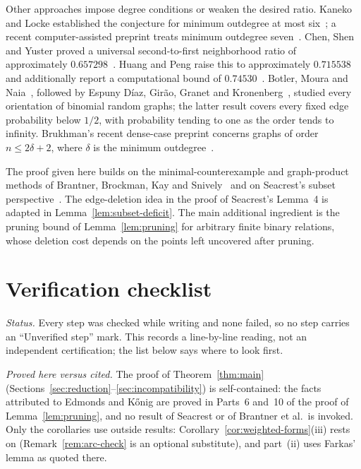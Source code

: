 \documentclass[11pt]{article}
\theoremstyle{remark}
\begin{document}
Other approaches impose degree conditions or weaken the desired ratio.
Kaneko and Locke established the conjecture for minimum outdegree at most
six~\cite{KanekoLocke2001}; a recent computer-assisted preprint treats
minimum outdegree seven~\cite{SadhukhanSandeepSen2026}.
Chen, Shen and Yuster proved a universal second-to-first neighborhood
ratio of approximately $0.657298$~\cite{ChenShenYuster2003}.
Huang and Peng raise this to approximately $0.715538$ and additionally
report a computational bound of $0.74530$~\cite{HuangPeng2024}.
Botler, Moura and Naia~\cite{BotlerMouraNaia2023}, followed by
Espuny D\'iaz, Gir\~ao, Granet and Kronenberg~\cite{EspunyDiazEtAl2025},
studied every orientation of binomial random graphs; the latter result
covers every fixed edge probability below $1/2$, with probability tending
to one as the order tends to infinity. Brukhman's recent dense-case
preprint concerns graphs of order $n\leq 2\delta+2$, where $\delta$ is
the minimum outdegree~\cite{Brukhman2026}.

The proof given here builds on the minimal-counterexample and graph-product
methods of Brantner, Brockman, Kay and
Snively~\cite{BrantnerBrockmanKaySnively2009} and on Seacrest's
subset perspective~\cite{Seacrest2019}. The edge-deletion idea in the proof
of Seacrest's Lemma~4 is adapted in Lemma~\ref{lem:subset-deficit}. The main
additional ingredient is the pruning bound of Lemma~\ref{lem:pruning} for
arbitrary finite binary relations, whose deletion cost depends on the points
left uncovered after pruning.

\section{Verification checklist}\label{sec:checklist}

\emph{Status.} Every step was checked while writing and none failed, so no
step carries an ``Unverified step'' mark. This records a line-by-line
reading, not an independent certification; the list below says where to
look first.

\emph{Proved here versus cited.} The proof of Theorem~\ref{thm:main}
(Sections~\ref{sec:reduction}--\ref{sec:incompatibility}) is self-contained:
the facts attributed to Edmonds and K\H{o}nig are proved in Parts~6 and~10
of the proof of Lemma~\ref{lem:pruning}, and no result of Seacrest or of
Brantner et al.\ is invoked. Only the corollaries use outside results:
Corollary~\ref{cor:weighted-forms}\textup{(iii)} rests on
\cite[Proposition~2]{Seacrest2015} (Remark~\ref{rem:arc-check} is an
optional substitute), and part~\textup{(ii)} uses Farkas' lemma as quoted
there.
\end{document}
